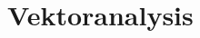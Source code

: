 \documentclass[a4paper,10pt]{scrbook}
\begin{document}
%
%



\section{Vektoranalysis}
\end{document}
